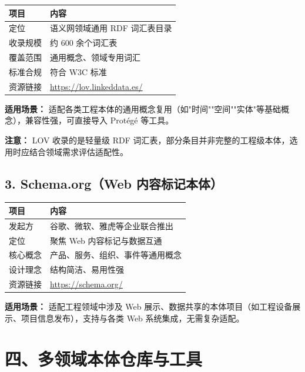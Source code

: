 \begin{center}
\begin{tabular}{@{}ll@{}}
\toprule
\textbf{项目} & \textbf{内容} \\
\midrule
定位 & 语义网领域通用 RDF 词汇表目录 \\
收录规模 & 约 600 余个词汇表 \\
覆盖范围 & 通用概念、领域专用词汇 \\
标准合规 & 符合 W3C 标准 \\
资源链接 & \url{https://lov.linkeddata.es/} \\
\bottomrule
\end{tabular}
\end{center}
\color{black}

\textbf{适用场景：} 适配各类工程本体的通用概念复用（如"时间""空间""实体"等基础概念），兼容性强，可直接导入 Protégé 等工具。

\begin{noteblock}
\textbf{注意：} LOV 收录的是轻量级 RDF 词汇表，部分条目并非完整的工程级本体，选用时应结合领域需求评估适配性。
\end{noteblock}


\subsection{3. Schema.org（Web 内容标记本体）}

\begin{center}
\begin{tabular}{@{}ll@{}}
\toprule
\textbf{项目} & \textbf{内容} \\
\midrule
发起方 & 谷歌、微软、雅虎等企业联合推出 \\
定位 & 聚焦 Web 内容标记与数据互通 \\
核心概念 & 产品、服务、组织、事件等通用概念 \\
设计理念 & 结构简洁、易用性强 \\
资源链接 & \url{https://schema.org/} \\
\bottomrule
\end{tabular}
\end{center}
\color{black}

\textbf{适用场景：} 适配工程领域中涉及 Web 展示、数据共享的本体项目（如工程设备展示、项目信息发布），支持与各类 Web 系统集成，无需复杂适配。


\section{四、多领域本体仓库与工具}

